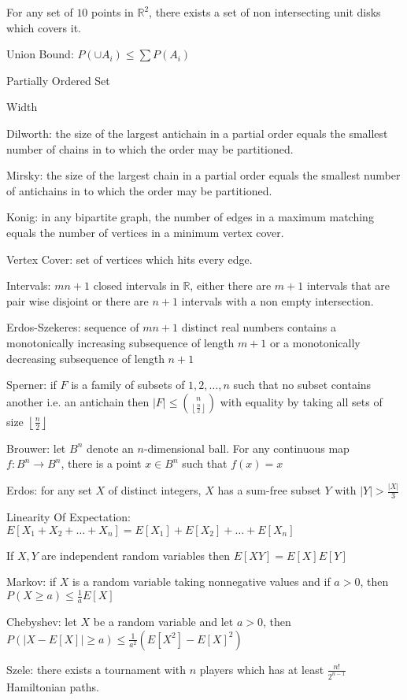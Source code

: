 For any set of $10$ points in $\mathbb{R}^2$, there exists a set of non intersecting unit disks which covers it.

Union Bound: $P(\cup A_i) \le \sum P(A_i)$

Partially Ordered Set

Width

Dilworth: the size of the largest antichain in a partial order equals the smallest number of chains in to which the order may be partitioned.

Mirsky: the size of the largest chain in a partial order equals the smallest number of antichains in to which the order may be partitioned.

Konig: in any bipartite graph, the number of edges in a maximum matching equals the number of vertices in a minimum vertex cover.

Vertex Cover: set of vertices which hits every edge.

Intervals: $mn+1$ closed intervals in $\mathbb{R}$, either there are $m+1$ intervals that are pair wise disjoint or there are $n+1$ intervals with a non empty intersection.

Erdos-Szekeres: sequence of $mn+1$ distinct real numbers contains a monotonically increasing subsequence of length $m+1$ or a monotonically decreasing subsequence of length $n+1$

Sperner: if $F$ is a family of subsets of ${1,2,\dots,n}$ such that no subset contains another i.e. an antichain then $|F| \le \binom{n}{\left \lfloor \frac{n}{2} \right \rfloor}$ with equality by taking all sets of size $\left \lfloor \frac{n}{2} \right \rfloor$

Brouwer: let $B^n$ denote an $n$-dimensional ball. For any continuous map $f: B^n \to B^n$, there is a point $x \in B^n$ such that $f(x)=x$

Erdos: for any set $X$ of distinct integers, $X$ has a sum-free subset $Y$ with $|Y| > \frac{|X|}{3}$

Linearity Of Expectation: $E[X_1 + X_2 + \dots + X_n] = E[X_1] + E[X_2] + \dots + E[X_n]$

If $X,Y$ are independent random variables then $E[XY] = E[X]E[Y]$

Markov: if $X$ is a random variable taking nonnegative values and if $a>0$, then $P(X \ge a) \le \frac{1}{a} E[X]$

Chebyshev: let $X$ be a random variable and let $a>0$, then $P(|X-E[X]| \ge a) \le \frac{1}{a^2}(E[X^2]-E[X]^2)$

Szele: there exists a tournament with $n$ players which has at least $\frac{n!}{2^{n-1}}$ Hamiltonian paths.

